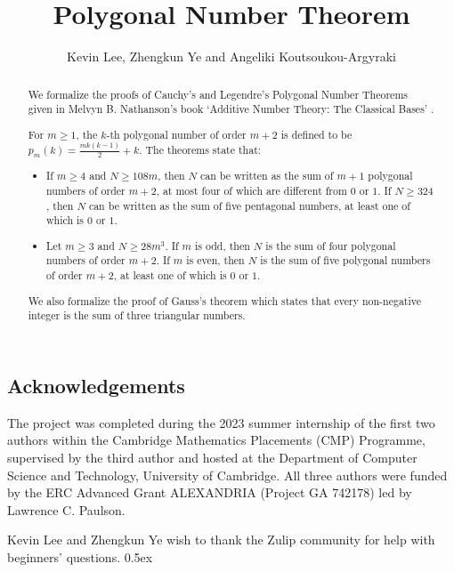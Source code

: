 \documentclass[11pt,a4paper]{article}
\begin{document}
\title{Polygonal Number Theorem}
\author{Kevin Lee, Zhengkun Ye and Angeliki Koutsoukou-Argyraki}
\maketitle

\begin{abstract}
  We formalize the proofs of Cauchy's and Legendre's Polygonal Number Theorems given in Melvyn B. Nathanson's book `Additive Number Theory: The Classical Bases' \cite{nathanson1996}.
  
  For $m \geq 1$, the $k$-th polygonal number of order $m+2$ is defined to be $p_m(k)=\frac{mk(k-1)}{2}+k$. The theorems state that:
  \begin{itemize}
    \item If $m \ge 4$ and $N \geq 108m$, then $N$ can be written as the sum of $m+1$ polygonal numbers of order $m+2$, at most four of which are different from $0$ or $1$. If $N \geq 324$, then $N$ can be written as the sum of five pentagonal numbers, at least one of which is $0$ or $1$.
	\item Let $m \geq 3$ and $N \geq 28m^3$. If $m$ is odd, then $N$ is the sum of four polygonal numbers of order $m+2$. If $m$ is even, then $N$ is the sum of five polygonal numbers of order $m+2$, at least one of which is $0$ or $1$.
  \end{itemize}
  We also formalize the proof of Gauss's theorem which states that every non-negative integer is the sum of three triangular numbers.
\end{abstract}
\newpage
\tableofcontents

\subsection*{Acknowledgements}
The project was completed during the 2023 summer internship of the first two authors within the Cambridge
Mathematics Placements (CMP) Programme, supervised by the third author and hosted at the Department of Computer Science and Technology, University of Cambridge. All three authors were funded by the ERC Advanced Grant ALEXANDRIA (Project GA 742178)
led by Lawrence C. Paulson.

Kevin Lee and Zhengkun Ye wish to thank the Zulip community for help with beginners' questions.
\newpage
\parindent 0pt\parskip 0.5ex





\end{document}
